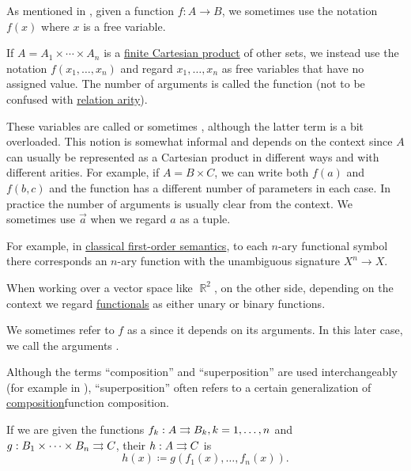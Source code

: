 \begin{definition}\label{def:function_arguments}
  As mentioned in , given a function \( f: A \to B \), we sometimes use the notation \( f(x) \) where \( x \) is a free variable.

  If \( A = A_1 \times \cdots \times A_n \) is a \hyperref[def:binary_cartesian_product]{finite Cartesian product} of other sets, we instead use the notation \( f(x_1, \ldots, x_n) \) and regard \( x_1, \ldots, x_n \) as free variables that have no assigned value. The number of arguments is called the function  (not to be confused with \hyperref[def:relation/arity]{relation arity}).

  These variables are called  or sometimes , although the latter term is a bit overloaded. This notion is somewhat informal and depends on the context since \( A \) can usually be represented as a Cartesian product in different ways and with different arities. For example, if \( A = B \times C \), we can write both \( f(a) \) and \( f(b, c) \) and the function has a different number of parameters in each case. In practice the number of arguments is usually clear from the context. We sometimes use \( \overrightarrow{a} \) when we regard \( a \) as a tuple.

  For example, in \hyperref[def:first_order_semantics]{classical first-order semantics}, to each \( n \)-ary functional symbol there corresponds an \( n \)-ary function with the unambiguous signature \( X^n \to X \).

  When working over a vector space like \( \BbbR^2 \), on the other side, depending on the context we regard \hyperref[rem:functional]{functionals} as either unary or binary functions.

  We sometimes refer to \( f \) as a  since it depends on its arguments. In this later case, we call the arguments .
\end{definition}

\begin{definition}\label{def:superposition}
  Although the terms \enquote{composition} and \enquote{superposition} are used interchangeably (for example in \cite[]{Фихтенгольц1968Том1}), \enquote{superposition} often refers to a certain generalization of \hyperref[def:multi_valued_function]{composition}{function composition}.

  If we are given the functions \( f_k: A \rightrightarrows B_k, k = 1, \ldots, n \) and \( g: B_1 \times \cdots \times B_n \rightrightarrows C \), their  \( h: A \rightrightarrows C \) is
  \begin{equation*}
    h(x) \coloneqq g(f_1(x), \ldots, f_n(x)).
  \end{equation*}
\end{definition}

